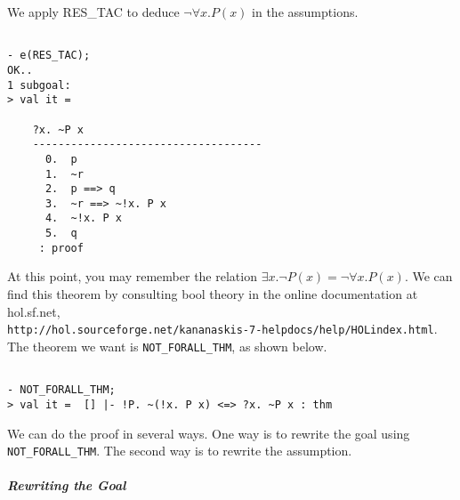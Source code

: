 We apply RES\_TAC to deduce $\neg \forall x.P(x)$ in the assumptions.
\begin{session}
  \begin{scriptsize}
\begin{verbatim}

- e(RES_TAC);
OK..
1 subgoal:
> val it =
    
    ?x. ~P x
    ------------------------------------
      0.  p
      1.  ~r
      2.  p ==> q
      3.  ~r ==> ~!x. P x
      4.  ~!x. P x
      5.  q
     : proof
\end{verbatim}
  \end{scriptsize}
\end{session}

At this point, you may remember the relation $\exists x.\neg P(x) =
\neg \forall x.P(x)$.  We can find this theorem by consulting bool
theory in the online documentation at hol.sf.net,\\
\verb|http://hol.sourceforge.net/kananaskis-7-helpdocs/help/HOLindex.html|. The
theorem we want is \verb|NOT_FORALL_THM|, as shown below.
\begin{session}
  \begin{scriptsize}
\begin{verbatim}

- NOT_FORALL_THM;
> val it =  [] |- !P. ~(!x. P x) <=> ?x. ~P x : thm
\end{verbatim}
  \end{scriptsize}
\end{session}
We can do the proof in several ways.  One way is to rewrite the goal
using \verb|NOT_FORALL_THM|. The second way is to rewrite the
assumption.
\subparagraph{Rewriting the Goal}

